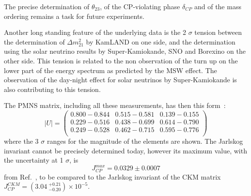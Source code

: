 The precise determination of $\theta_{23}$, of the CP-violating phase $\delta_{CP}$ and of the mass ordering remains a task for future experiments.

Another long standing feature of the underlying data is the 2 $\sigma$ tension between the determination of $\Delta m^2_{21}$ by KamLAND on one side, and the determination using the solar neutrino results by Super-Kamiokande, SNO and Borexino on the other side.
This tension is related to the non observation of the turn up on the lower part of the energy spectrum as predicted by the MSW effect. The observation of the day-night effect for solar neutrinos by Super-Kamiokande is also contributing to this tension.

The PMNS matrix, including all these measurements, has then this form~\cite{nufit}: 
\begin{equation}
|U| = \begin{pmatrix}
0.800 - 0.844 & 0.515 - 0.581 & 0.139 - 0.155 \\
0.229 - 0.516 & 0.438 - 0.699 & 0.614 - 0.790 \\
0.249 - 0.528 & 0.462 - 0.715 & 0.595 - 0.776 \\
\end{pmatrix}
\end{equation}
where the 3 $\sigma$ ranges for the magnitude of the elements are shown.
The Jarlskog invariant cannot be precisely determined today, however its maximum value, with the uncertainty at 1 $\sigma$, is 
\begin{equation}
J_{CP}^{max}
= 0.0329 \pm 0.0007 
\end{equation}
from Ref.~\cite{nufit}, to be compared to the Jarlskog invariant of the CKM matrix
$J_{CP}^{CKM} = (3.04 \: {}^{+0.21} _{-0.20} ) \times 10^{-5}$.

